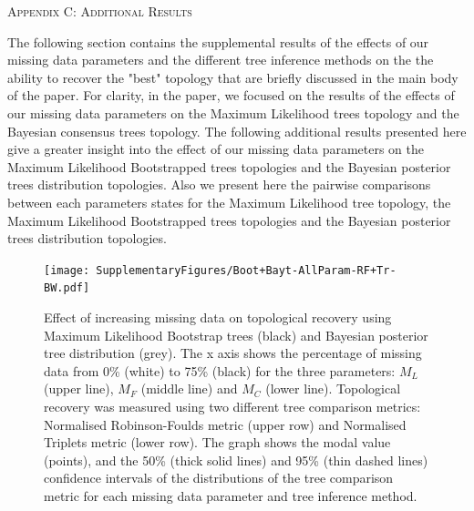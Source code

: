 \documentclass[12pt,letterpaper]{article}
\renewcommand{\section}[1]{%
\bigskip
\begin{center}
\begin{Large}
\normalfont\scshape #1
\medskip
\end{Large}
\end{center}}
\begin{document}
\section{Appendix C: Additional Results}

The following section contains the supplemental results of the effects of our missing data parameters and the different tree inference methods on the the ability to recover the "best" topology that are briefly discussed in the main body of the paper. For clarity, in the paper, we focused on the results of the effects of our missing data parameters on the Maximum Likelihood trees topology and the Bayesian consensus trees topology. The following additional results presented here give a greater insight into the effect of our missing data parameters on the Maximum Likelihood Bootstrapped trees topologies and the Bayesian posterior trees distribution topologies. Also we present here the pairwise comparisons between each parameters states for the Maximum Likelihood tree topology, the Maximum Likelihood Bootstrapped trees topologies and the Bayesian posterior trees distribution topologies.

\begin{figure} 
\centering
    \texttt{[image: SupplementaryFigures/Boot+Bayt-AllParam-RF+Tr-BW.pdf]}
    \caption{Effect of increasing missing data on topological recovery using Maximum Likelihood Bootstrap trees (black) and Bayesian posterior tree distribution (grey). The x axis shows the percentage of missing data from 0\% (white) to 75\% (black) for the three parameters: $M_{L}$ (upper line), $M_{F}$ (middle line) and $M_{C}$ (lower line). Topological recovery was measured using two different tree comparison metrics: Normalised Robinson-Foulds metric (upper row) and Normalised Triplets metric (lower row). The graph shows the modal value (points), and the 50\% (thick solid lines) and 95\% (thin dashed lines) confidence intervals of the distributions of the tree comparison metric for each missing data parameter and tree inference method.} 
\label{Fig_Supp_BootBayt_allparam} 
\end{figure}
\end{document}
